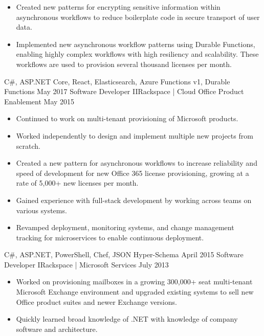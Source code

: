 \begin{experiences}
{\begin{itemize}
                        \item Created new patterns for encrypting sensitive information within asynchronous workflows to reduce boilerplate code in secure transport of user data.
                        \item Implemented new asynchronous workflow patterns using Durable Functions, enabling highly complex workflows with high resiliency and scalability. These workflows are used to provision several thousand licenses per month.
                      \end{itemize}
                    }
                    {C\#, ASP.NET Core, React, Elasticsearch, Azure Functions v1, Durable Functions}
  \emptySeparator
  \experience
    {May 2017}     {Software Developer II}{Rackspace | Cloud Office Product Enablement}
    {May 2015}     {
                      \begin{itemize}
                        \item Continued to work on multi-tenant provisioning of Microsoft products.
                        \item Worked independently to design and implement multiple new projects from scratch.
                        \item Created a new pattern for asynchronous workflows to increase reliability and speed of development for new Office 365 license provisioning, growing at a rate of 5,000+ new licenses per month.
                        \item Gained experience with full-stack development by working across teams on various systems.
                        \item Revamped deployment, monitoring systems, and change management tracking for microservices to enable continuous deployment.
                      \end{itemize}
                    }
                    {C\#, ASP.NET, PowerShell, Chef, JSON Hyper-Schema}
  \emptySeparator
  \experience
  {April 2015}       {Software Developer I}{Rackspace | Microsoft Services}
  {July 2013}        {
                      \begin{itemize}
                        \item Worked on provisioning mailboxes in a growing 300,000+ seat multi-tenant Microsoft Exchange environment and upgraded existing systems to sell new Office product suites and newer Exchange versions.
                        \item Quickly learned broad knowledge of .NET with knowledge of company software and architecture.

\end{itemize}}
\end{experiences}
